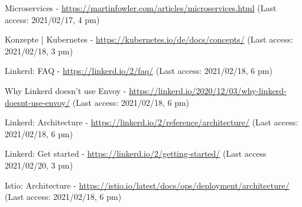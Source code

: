 \begin{thebibliography}{00}
 Microservices - \url{https://martinfowler.com/articles/microservices.html} (Last access: 2021/02/17, 4 pm)

 Konzepte | Kubernetes - \url{https://kubernetes.io/de/docs/concepts/} (Last access: 2021/02/18, 3 pm)

 Linkerd: FAQ - \url{https://linkerd.io/2/faq/} (Last access: 2021/02/18, 6 pm)

 Why Linkerd doesn't use Envoy - \url{https://linkerd.io/2020/12/03/why-linkerd-doesnt-use-envoy/} (Last access: 2021/02/18, 6 pm)

 Linkerd: Architecture - \url{https://linkerd.io/2/reference/architecture/} (Last access: 2021/02/18, 6 pm)

 Linkerd: Get started - \url{https://linkerd.io/2/getting-started/} (Last access 2021/02/20, 3 pm)

 Istio: Architecture - \url{https://istio.io/latest/docs/ops/deployment/architecture/} (Last access: 2021/02/18, 6 pm)

\end{thebibliography}